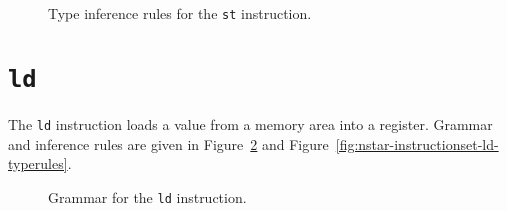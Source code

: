 \begin{figure}[H]
  \centering


  \caption{Type inference rules for the \texttt{st} instruction.}
  \label{fig:nstar-instructionset-st-typerules}
\end{figure}

\section{\texttt{ld}}\label{sec:nstar-instructionset-ld}

The \texttt{ld} instruction loads a value from a memory area into a register.
Grammar and inference rules are given in Figure~\ref{fig:nstar-instructionset-ld-grammar} and Figure~\ref{fig:nstar-instructionset-ld-typerules}.

\begin{figure}[H]
  \centering


  \caption{Grammar for the \texttt{ld} instruction.}
  \label{fig:nstar-instructionset-ld-grammar}
\end{figure}

